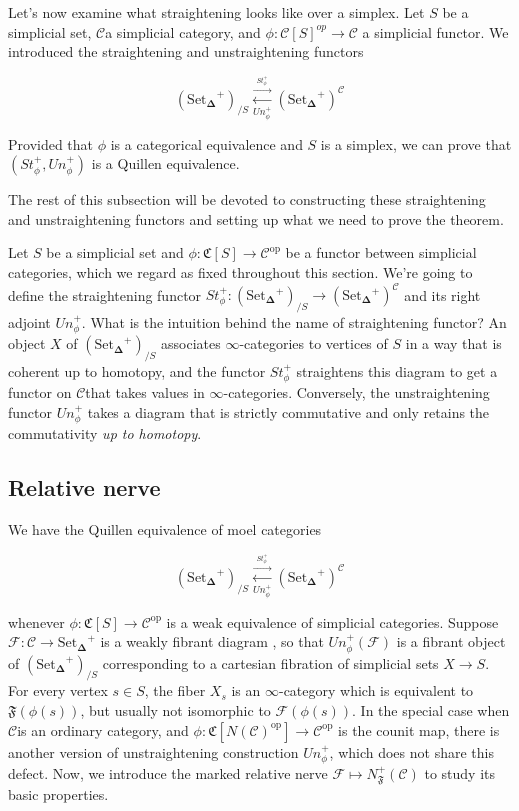 \documentclass[12pt]{amsart}
\newcommand{\8}{\ensuremath{\infty}}
\newcommand{\C}{\ensuremath{\mathscr{C}}}
\newcommand{\SSet}{\ensuremath{\text{Set}_{\boldsymbol{\Delta}}}}
\newcommand{\op}[1]{\ensuremath{{#1}^{\text{op}}}}
\newcommand{\adj}[2]{\ensuremath{\overset{\overset{#1}{ \rightarrow}}{\underset{#2}{\leftarrow}}}}
\begin{document}
Let's now examine what straightening looks like over a simplex. Let $S$ be a simplicial set, \C a simplicial category, and $\phi:\mathscr{C}[S]^{op}\rightarrow \C$ a simplicial functor. We introduced the straightening and unstraightening functors

$$
  (\SSet^+)_{/S}\adj{St^+_\phi}{Un^+_\phi} (\SSet^+)^\C
$$

Provided that $\phi$ is a categorical equivalence and $S$ is a simplex, we can prove that $(St^+_\phi, Un^+_\phi)$ is a Quillen equivalence.

The rest of this subsection will be devoted to constructing these straightening and unstraightening functors and setting up what we need to prove the theorem.

Let $S$ be a simplicial set and $\phi: \mathfrak{C}[S] \rightarrow \op\C$ be a functor between simplicial categories, which we regard as fixed throughout this section. We're going to define the straightening functor $St_\phi^+: (\SSet^+)_{/S} \rightarrow (\SSet^+)^\C$ and its right adjoint $Un_\phi^+$. What is the intuition behind the name of straightening functor? An object $X$ of $(\SSet^+)_{/S}$ associates \8-categories to vertices of $S$ in a way that is coherent up to homotopy, and the functor $St_\phi^+$ straightens this diagram to get a functor on \C that takes values in \8-categories. Conversely, the unstraightening functor $Un_\phi^+$ takes a diagram that is strictly commutative and only retains the commutativity \emph{up to homotopy}.

\subsection{Relative nerve}

We have the Quillen equivalence of moel categories

$$
  (\SSet^+)_{/S} \adj{St^+_\phi}{Un^+_\phi} (\SSet^+)^\C
$$

whenever $\phi: \mathfrak{C}[S] \rightarrow \op\C$ is a weak equivalence of simplicial categories. Suppose $\mathcal{F} : \C \rightarrow \SSet^{+}$ is a weakly fibrant diagram , so that $Un_\phi^+(\mathcal{F})$ is a fibrant object of $(\SSet^+)_{/S}$ corresponding to a cartesian fibration of simplicial sets $X \rightarrow S$. For every vertex $s \in S$, the fiber $X_s$ is an \8-category which is equivalent to $\mathfrak{F}(\phi(s))$, but usually not isomorphic to $\mathcal{F}(\phi(s))$. In the special case when \C is an ordinary category, and $\phi: \mathfrak{C}[\op{N(\C)}] \rightarrow \op\C$ is the counit map, there is another version of unstraightening construction $Un_\phi^+$, which does not share this defect. Now, we introduce the marked relative nerve $\mathcal{F} \mapsto N_\mathfrak{F}^+(\C)$ to study its basic properties.
\end{document}
